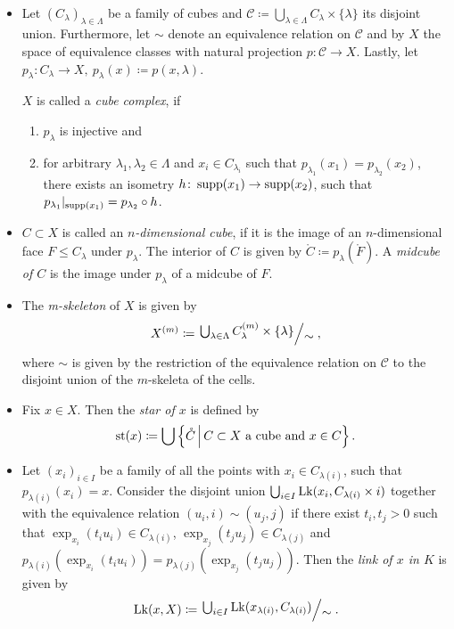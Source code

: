 \begin{defin}\ 
  \begin{itemize}
  \item Let \((C_\lambda)_{\lambda \in \Lambda}\) be a family of cubes and \(\mathcal{C} \coloneqq \bigcup_{\lambda \in \Lambda} C_\lambda \times \{\lambda\}\) its disjoint union. Furthermore, let \(\sim\) denote an equivalence relation on \(\mathcal{C}\) and by \(X\) the space of equivalence classes with natural projection \(p \colon \mathcal{C} \to X\). Lastly, let \(p_\lambda \colon C_\lambda \to X,\ p_\lambda(x) \coloneqq p(x, \lambda)\).

    \(X\) is called a \emph{cube complex}, if
    \begin{enumerate}
    \item \(p_\lambda\) is injective and
    \item for arbitrary \(\lambda_1, \lambda_2 \in \Lambda\) and \(x_i \in C_{\lambda_i}\) such that \(p_{\lambda_1}(x_1) = p_{\lambda_2}(x_2)\), there exists an isometry \(h\colon \operatorname{supp}(x_1) \to \operatorname{supp}(x_2)\), such that \(p_{\lambda_1}|_{\operatorname{supp}(x_1)} = p_{\lambda_2} \circ h\).
    \end{enumerate}
  \item \(C \subset X\) is called an \emph{\(n\)-dimensional cube}, if it is the image of an \(n\)-dimensional face \(F \leq C_\lambda\) under \(p_\lambda\). The interior of \(C\) is given by \(\mathring C \coloneqq p_\lambda(\mathring F)\). A \emph{midcube of \(C\)} is the image under \(p_\lambda\) of a midcube of \(F\).
  \item The \emph{m-skeleton} of \(X\) is given by
    \begin{align*}
      X^{(m)} \coloneqq \quot{\bigcup_{\lambda \in \Lambda} C_\lambda^{(m)} \times \{\lambda\}}{\sim},
    \end{align*}
    where \(\sim\) is given by the restriction of the equivalence relation on \(\mathcal{C}\) to the disjoint union of the \(m\)-skeleta of the cells.

  \item Fix \(x \in X\). Then the \emph{star of \(x\)} is defined by
    \begin{align*}
      \operatorname{st}(x) \coloneqq \bigcup \left\{\mathring C \,\middle|\, C \subset X \text{ a cube and } x \in C\right\}.
    \end{align*}
  \item Let \((x_i)_{i \in I}\) be a family of all the points with \(x_i \in C_{\lambda(i)}\), such that \(p_{\lambda(i)}(x_i) = x\). Consider the disjoint union \(\bigcup_{i \in I} \operatorname{Lk}(x_i, C_{\lambda(i)} \times {i})\) together with the equivalence relation \((u_i, i) \sim (u_j, j)\) if there exist \(t_i, t_j > 0\) such that \(\exp_{x_i}(t_i u_i) \in C_{\lambda(i)}\), \(\exp_{x_j}(t_j u_j) \in C_{\lambda(j)}\) and \(p_{\lambda(i)}(\exp_{x_i}(t_i u_i)) = p_{\lambda(j)}(\exp_{x_j}(t_j u_j))\). Then the \emph{link of \(x\) in \(K\)} is given by
    \begin{align*}
      \lk(x, X) \coloneqq \quot{\bigcup_{i \in I} \lk(x_{\lambda(i)}, C_{\lambda(i)})}{\sim}.
    \end{align*}
  \end{itemize}
\end{defin}

